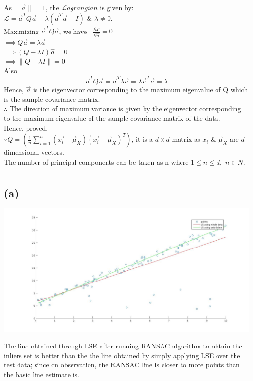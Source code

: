 \documentclass[a4paper,fleqn,11pt]{article}
\theoremstyle{mytheor}
\begin{document}
As $\|\vec{a}\| = 1$, the $\mathscr{L}agrangian$ is given by: \\
$\mathscr{L} = \vec{a}^T Q \vec{a} - \lambda (\vec{a}^T \vec{a} - I)$ \& $\lambda \neq 0.$ \\
Maximizing $\vec{a}^T Q \vec{a}$, we have : 
$\frac{\partial \mathscr{L}}{\partial \vec{a}} = 0$ \\
$\implies Q\vec{a} = \lambda \vec{a}$ \\
$\implies (Q - \lambda I)\vec{a} = 0$ \\
$\implies \|Q - \lambda I\| = 0$ \\
Also,
\begin{equation*}
\vec{a}^T Q\vec{a} = \vec{a}^T \lambda \vec{a} = \lambda \vec{a}^T \vec{a} = \lambda
\end{equation*}
Hence, $\vec{a}$ is the eigenvector corresponding to the maximum eigenvalue of Q which is the sample covariance matrix. \\
$\therefore$ The direction of maximum variance is given by the eigenvector corresponding to the maximum eigenvalue of the sample covariance matrix of the data. \\
Hence, proved. \\
$\because Q = (\frac{1}{n}\sum_{i = 1}^{n}(\vec{x_{i}} - \vec{\mu}_{X})(\vec{x_{i}} - \vec{\mu}_{X})^T)$, it is a $d \times d$ matrix as $x_{i}$ \& $\vec{\mu}_{X}$ are $d$ dimensional vectors. \\
The number of principal components can be taken as n where $1 \leq n \leq d,$ $n \in \!N$.
\section{}
\subsection{(a)}
\begin{center}
\includegraphics[scale = 0.35]{../images/ols.jpg}
\end{center}
The line obtained through LSE after running RANSAC algorithm to obtain the inliers set is better than the the line obtained by simply applying LSE over the test data; since on observation, the RANSAC line is closer to more points than the basic line estimate is.
\pagebreak
\end{document}
